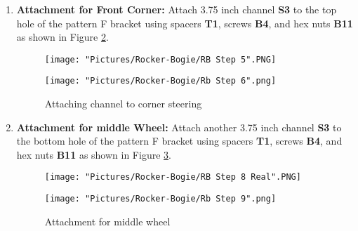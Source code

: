 \documentclass[12pt]{article}
\begin{document}
\begin{enumerate}
\begin{figure}[H]
  \centering
  \begin{minipage}[b]{0.45\textwidth}
    \texttt{[image: "Pictures/Rocker-Bogie/RB Step 3".PNG]}
  \end{minipage}
  \hfill
  \begin{minipage}[b]{0.45\textwidth}
    \texttt{[image: "Pictures/Rocker-Bogie/RB Step 4".PNG]}
  \end{minipage}
  \caption{Start Rocker-Bogie pivot joint}
  \label{RB2}
\end{figure}




\item \textbf{Attachment for Front Corner:} Attach 3.75 inch channel \textbf{S3} to the top hole of the pattern F bracket using spacers \textbf{T1}, screws \textbf{B4}, and hex nuts \textbf{B11} as shown in Figure \ref{attaching channel corner}.

\begin{figure}[H]
  \centering
  \begin{minipage}[b]{0.45\textwidth}
    \texttt{[image: "Pictures/Rocker-Bogie/RB Step 5".PNG]}
  \end{minipage}
  \hfill
  \begin{minipage}[b]{0.45\textwidth}
    \texttt{[image: "Pictures/Rocker-Bogie/Rb Step 6".png]}
  \end{minipage}
  \caption{Attaching channel to corner steering}
  \label{attaching channel corner}
\end{figure}


\item \textbf{Attachment for middle Wheel:} Attach another 3.75 inch channel \textbf{S3} to the bottom hole of the pattern F bracket using spacers \textbf{T1}, screws \textbf{B4}, and hex nuts \textbf{B11} as shown in Figure \ref{attaching middle wheel}.

\begin{figure}[H]
  \centering
  \begin{minipage}[b]{0.45\textwidth}
    \texttt{[image: "Pictures/Rocker-Bogie/RB Step 8 Real".PNG]}
  \end{minipage}
  \hfill
  \begin{minipage}[b]{0.45\textwidth}
    \texttt{[image: "Pictures/Rocker-Bogie/Rb Step 9".png]}
  \end{minipage}
  \caption{Attachment for middle wheel}
  \label{attaching middle wheel}
\end{figure}



\end{enumerate}
\end{document}

